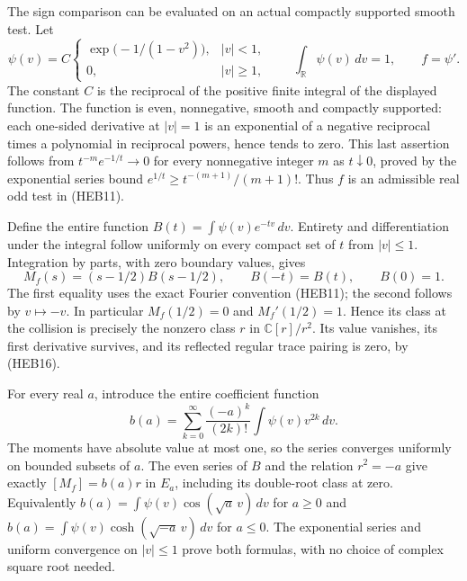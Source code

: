 \documentclass[
  10pt,
  a4paper,
]{article}
\begin{document}
The sign comparison can be evaluated on an actual compactly supported
smooth test. Let \[
\psi(v)=C\begin{cases}\exp\bigl(-1/(1-v^2)\bigr),&|v|<1,\\0,&|v|\ge1,\end{cases}
\qquad \int_{\mathbb R}\psi(v)\,dv=1,\qquad f=\psi'.
\tag{HEB33}
\] The constant \(C\) is the reciprocal of the positive finite integral
of the displayed function. The function is even, nonnegative, smooth and
compactly supported: each one-sided derivative at \(|v|=1\) is an
exponential of a negative reciprocal times a polynomial in reciprocal
powers, hence tends to zero. This last assertion follows from
\(t^{-m}e^{-1/t}\to0\) for every nonnegative integer \(m\) as
\(t\downarrow0\), proved by the exponential series bound
\(e^{1/t}\ge t^{-(m+1)}/(m+1)!\). Thus \(f\) is an admissible real odd
test in (HEB11).

Define the entire function \(B(t)=\int\psi(v)e^{-tv}\,dv\). Entirety and
differentiation under the integral follow uniformly on every compact set
of \(t\) from \(|v|\le1\). Integration by parts, with zero boundary
values, gives \[
M_f(s)=(s-1/2)B(s-1/2),\qquad B(-t)=B(t),\qquad B(0)=1.
\tag{HEB34}
\] The first equality uses the exact Fourier convention (HEB11); the
second follows by \(v\mapsto-v\). In particular \(M_f(1/2)=0\) and
\(M_f'(1/2)=1\). Hence its class at the collision is precisely the
nonzero class \(r\) in \(\mathbb C[r]/r^2\). Its value vanishes, its
first derivative survives, and its reflected regular trace pairing is
zero, by (HEB16).

For every real \(a\), introduce the entire coefficient function \[
b(a)=\sum_{k=0}^{\infty}\frac{(-a)^k}{(2k)!}\int\psi(v)v^{2k}\,dv.
\tag{HEB35}
\] The moments have absolute value at most one, so the series converges
uniformly on bounded subsets of \(a\). The even series of \(B\) and the
relation \(r^2=-a\) give exactly \([M_f]=b(a)r\) in \(E_a\), including
its double-root class at zero. Equivalently
\(b(a)=\int\psi(v)\cos(\sqrt a\,v)\,dv\) for \(a\ge0\) and
\(b(a)=\int\psi(v)\cosh(\sqrt{-a}\,v)\,dv\) for \(a\le0\). The
exponential series and uniform convergence on \(|v|\le1\) prove both
formulas, with no choice of complex square root needed.
\end{document}
